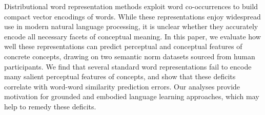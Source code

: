 Distributional word representation methods exploit word co-occurrences to build compact vector encodings of words. While these representations enjoy widespread use in modern natural language processing, it is unclear whether they accurately encode all necessary facets of conceptual meaning. In this paper, we evaluate how well these representations can predict perceptual and conceptual features of concrete concepts, drawing on two semantic norm datasets sourced from human participants. We find that several standard word representations fail to encode many salient perceptual features of concepts, and show that these deficits correlate with word-word similarity prediction errors. Our analyses provide motivation for grounded and embodied language learning approaches, which may help to remedy these deficits.
